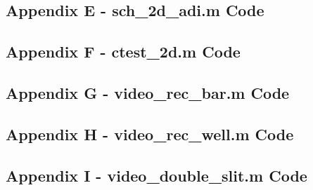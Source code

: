 \documentclass[10pt]{article}
\begin{document}
\subsection*{Appendix E - sch\_2d\_adi.m Code}

\pagebreak

\subsection*{Appendix F - ctest\_2d.m Code}

\pagebreak

\subsection*{Appendix G - video\_rec\_bar.m Code}

\pagebreak

\subsection*{Appendix H - video\_rec\_well.m Code}

\pagebreak

\subsection*{Appendix I - video\_double\_slit.m Code}

\pagebreak
\end{document}
